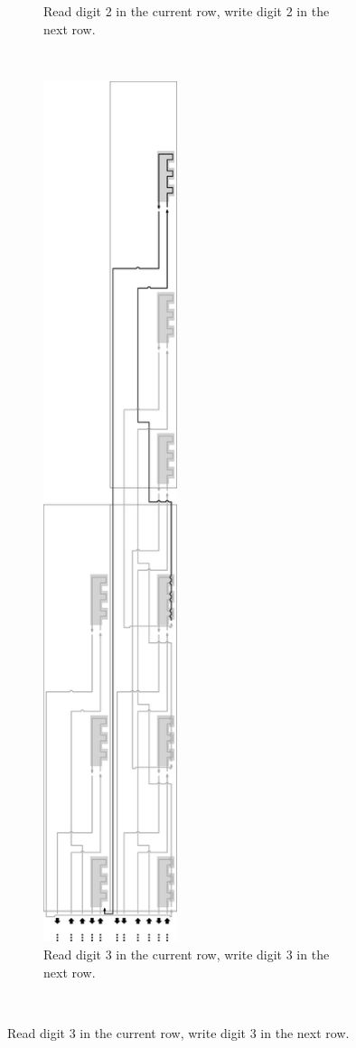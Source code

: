 \begin{figure}[H]
\begin{subfigure}[t]{0.43\textwidth}
        \caption{\label{fig:counter_read_digit2_general_case3_middle_level} Read digit 2 in the current row, write digit 2 in the next row.}
    \end{subfigure}%
    ~
    \begin{subfigure}[t]{0.43\textwidth}
        \centering
        \includegraphics[width=0.43\textwidth]{counter_read_digit3_return_read_digit1_general_case3_middle_level}
        \caption{\label{fig:counter_read_digit3_general_case3_middle_level} Read digit 3 in the current row, write digit 3 in the next row.}
    \end{subfigure}%
    ~

\end{figure}
